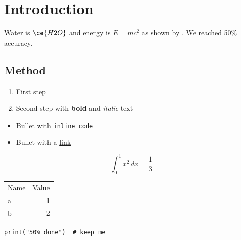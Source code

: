 \documentclass{article}
\begin{document}
\section{Introduction}\label{sec:intro}
Water is $\ce{H2O}$ and energy is $E = mc^2$ as shown by \cite{einstein1905}. %
We reached 50\% accuracy.

\subsection*{Method}
\begin{enumerate}
  \item First step
  \item Second step with \textbf{bold} and \emph{italic} text
\end{enumerate}

\begin{itemize}
  \item Bullet with \texttt{inline code}
  \item Bullet with a \href{https://example.com}{link}
\end{itemize}

\begin{equation}
  \int_0^1 x^2 \, dx = \frac{1}{3}
\end{equation}

\begin{tabular}{lr}
  Name & Value \\
  a & 1 \\
  b & 2 \\
\end{tabular}

\begin{verbatim}
print("50% done")  # keep me
\end{verbatim}
\end{document}
